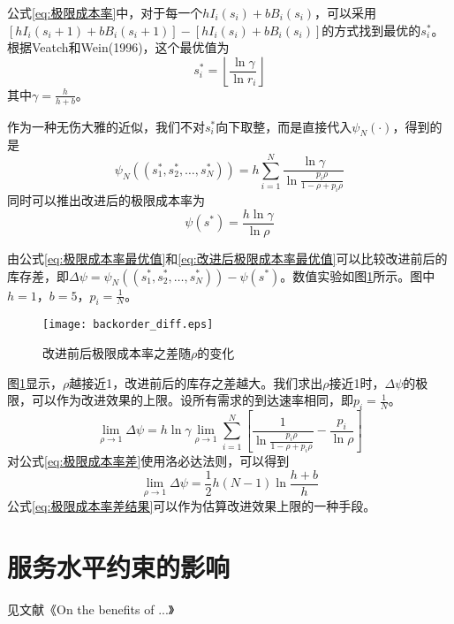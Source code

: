 公式\ref{eq:极限成本率}中，对于每一个$hI_i(s_i)+bB_i(s_i)$，可以采用$[hI_i(s_i+1)+bB_i(s_i+1)]-[hI_i(s_i)+bB_i(s_i)]$的方式找到最优的$s_i^*$。根据Veatch和Wein(1996)，这个最优值为
\[
s_i^* = \left\lfloor\frac{\ln\gamma}{\ln r_i}\right\rfloor
\]
其中$\gamma=\frac{h}{h+b}$。

作为一种无伤大雅的近似，我们不对$s_i^*$向下取整，而是直接代入$\psi_N(\cdot)$，得到的是
\begin{equation}
\psi_N((s_1^*,s_2^*,\ldots,s_N^*)) = h\sum_{i=1}^N\frac{\ln\gamma}{\ln\frac{p_i\rho}{1-\rho+p_i\rho}}
\label{eq:极限成本率最优值}
\end{equation}
同时可以推出改进后的极限成本率为
\begin{equation}
\psi(s^*) = \frac{h\ln\gamma}{\ln\rho}
\label{eq:改进后极限成本率最优值}
\end{equation}

由公式\ref{eq:极限成本率最优值}和\ref{eq:改进后极限成本率最优值}可以比较改进前后的库存差，即$\Delta\psi=\psi_N((s_1^*,s_2^*,\ldots,s_N^*))-\psi(s^*)$。数值实验如图\ref{fig:改进前后极限成本率之差}所示。图中$h=1$，$b=5$，$p_i=\frac{1}{N}$。

\begin{figure}[htbp]
\centering
\texttt{[image: backorder\_diff.eps]}
\caption{改进前后极限成本率之差随$\rho$的变化}
\label{fig:改进前后极限成本率之差}
\end{figure}

图\ref{fig:改进前后极限成本率之差}显示，$\rho$越接近1，改进前后的库存之差越大。我们求出$\rho$接近1时，$\Delta\psi$的极限，可以作为改进效果的上限。设所有需求的到达速率相同，即$p_i=\frac{1}{N}$。
\begin{equation}
\lim_{\rho\to 1}\Delta\psi = h\ln\gamma\lim_{\rho\to 1}\sum_{i=1}^N\left[\frac{1}{\ln\frac{p_i\rho}{1-\rho+p_i\rho}}-\frac{p_i}{\ln\rho}\right]
\label{eq:极限成本率差}
\end{equation}
对公式\ref{eq:极限成本率差}使用洛必达法则，可以得到
\begin{equation}
\lim_{\rho\to 1}\Delta\psi = \frac{1}{2}h(N-1)\ln\frac{h+b}{h}
\label{eq:极限成本率差结果}
\end{equation}
公式\ref{eq:极限成本率差结果}可以作为估算改进效果上限的一种手段。







\section{服务水平约束的影响}

见文献《On the benefits of ...》






